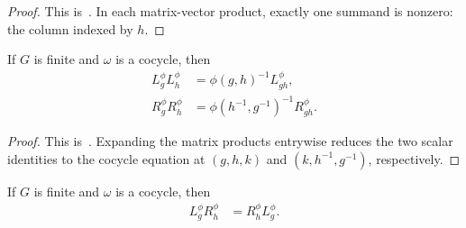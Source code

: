 \begin{proof}\leanok
    This is~\cite[``Action of the twisted regular
        matrices'']{QICLean2026Blueprint}.
    In each matrix-vector product, exactly one summand is nonzero: the column
    indexed by $h$.
\end{proof}

\begin{lemma}
    \label{thm:mpug_twisted_regular_multiplication}
    \leanok
    If $G$ is finite and $\omega$ is a cocycle, then
    \begin{align}
        L_g^\phi L_h^\phi
         & =\phi(g,h)^{-1}L_{gh}^\phi,           \\
        R_g^\phi R_h^\phi
         & =\phi(h^{-1},g^{-1})^{-1}R_{gh}^\phi.
        \label{eq:mpug_twisted_regular_multiplication}
    \end{align}
\end{lemma}

\begin{proof}\leanok
    This is~\cite[``Multiplication laws for twisted regular
        matrices'']{QICLean2026Blueprint}.
    Expanding the matrix products entrywise reduces the two scalar identities
    to the cocycle equation at $(g,h,k)$ and $(k,h^{-1},g^{-1})$, respectively.
\end{proof}

\begin{lemma}
    \label{thm:mpug_twisted_regular_commutation}
    \leanok
    If $G$ is finite and $\omega$ is a cocycle, then
    \begin{align}
        L_g^\phi R_h^\phi
         & =R_h^\phi L_g^\phi.
        \label{eq:mpug_twisted_regular_commutation}
    \end{align}
\end{lemma}

